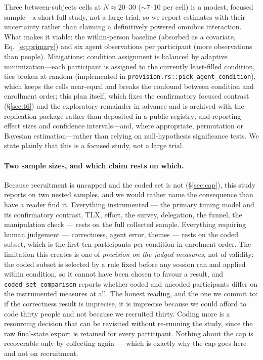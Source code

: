 \documentclass[11pt]{article}
\newcommand{\code}[1]{\texttt{#1}}
\begin{document}
Three between-subjects cells at $N\approx20$--$30$ ($\sim$7--10 per cell) is a
modest, focused sample---a short full study, not a large trial, so we report
estimates with their uncertainty rather than claiming a definitively powered
omnibus interaction. What makes it viable: the within-person baseline (absorbed
as a covariate, Eq.~\eqref{eq:primary}) and six agent observations per
participant (more observations than people).
Mitigations: condition assignment is balanced by adaptive minimization---each
participant is assigned to the currently least-filled condition, ties broken at
random (implemented in \code{provision.rs::pick\_agent\_condition}), which keeps
the cells near-equal and breaks the confound between condition and enrollment
order; this plan itself, which fixes the confirmatory focused contrast
(\S\ref{sec:t6}) and the exploratory remainder in advance and is archived with the
replication package rather than deposited in a public registry; and reporting
effect sizes and confidence
intervals---and, where appropriate, permutation or Bayesian estimation---rather
than relying on null-hypothesis significance tests. We state plainly that this is
a focused study, not a large trial.

\paragraph{Two sample sizes, and which claim rests on which.} Because
recruitment is uncapped and the coded set is not (\S\ref{sec:cap}), this study
reports on two nested samples, and we would rather name the consequence than
have a reader find it. Everything instrumented --- the primary timing model and
its confirmatory contrast, TLX, effort, the survey, delegation, the funnel, the
manipulation check --- rests on the full collected sample. Everything requiring
human judgement --- correctness, agent error, themes --- rests on the coded
subset, which is the first ten participants per condition in enrolment order.
The limitation this creates is one of \emph{precision on the judged measures},
not of validity: the coded subset is selected by a rule fixed before any session
ran and applied within condition, so it cannot have been chosen to favour a
result, and \code{coded\_set\_comparison} reports whether coded and uncoded
participants differ on the instrumented measures at all. The honest reading, and
the one we commit to: if the correctness result is imprecise, it is imprecise
because we could afford to code thirty people and not because we recruited
thirty. Coding more is a resourcing decision that can be revisited without
re-running the study, since the raw final-state export is retained for every
participant. Nothing about the cap is recoverable only by collecting again ---
which is exactly why the cap goes here and not on recruitment.
\end{document}
